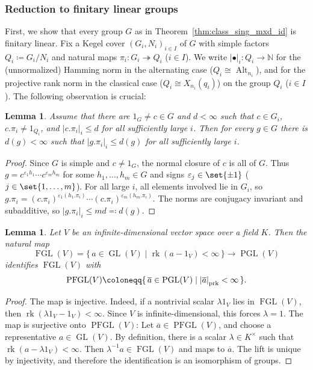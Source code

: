 \documentclass[a4paper,12pt]{amsproc}
\newcommand{\norm}[1]{\left\lvert#1\right\rvert}%
\DeclareMathOperator{\GL}{GL}%
\DeclareMathOperator{\rk}{rk}%
\DeclareMathOperator{\Alt}{Alt}%
\DeclareMathOperator{\FGL}{FGL}%
\DeclareMathOperator{\PFGL}{PFGL}%
\theoremstyle{plain}
\newtheorem{lemma}[definition]{Lemma}
\theoremstyle{definition}
\begin{document}
\subsubsection{Reduction to finitary linear groups}

First, we show that every group $G$ as in Theorem~\ref{thm:class_sing_mxd_id} is finitary linear. Fix a Kegel cover $(G_i,N_i)_{i\in I}$ of $G$ with simple factors $Q_i\coloneqq G_i/N_i$ and natural maps $\pi_i\colon G_i\twoheadrightarrow Q_i$ ($i\in I$). We write $\norm{\bullet}_i\colon Q_i\to\mathbb{N}$ for the (unnormalized) Hamming norm in the alternating case ($Q_i\cong \Alt_{n_i}$), and for the projective rank norm in the classical case ($Q_i\cong X_{n_i}(q_i)$) on the group $Q_i$ ($i\in I$). The following observation is crucial:

\begin{lemma}\label{lem:propagation}
Assume that there are $1_G\neq c\in G$ and $d<\infty$ such that
$c\in G_i$, $c.\pi_i\neq 1_{Q_i}$, and $\norm{c.\pi_i}_i\leq d$ for all
sufficiently large $i$. Then for every $g\in G$ there is
$d(g)<\infty$ such that $\norm{g.\pi_i}_i\leq d(g)$ for all sufficiently
large $i$.
\end{lemma}

\begin{proof}
Since $G$ is simple and $c\neq 1_G$, the normal closure of $c$ is all of
$G$. Thus $g=c^{\varepsilon_1h_1}\cdots c^{\varepsilon_m h_m}$ for some
$h_1,\ldots,h_m\in G$ and signs
$\varepsilon_j\in\set{\pm 1}$ ($j\in\set{1,\ldots,m}$). For all large $i$, all elements involved lie
in $G_i$, so $g.\pi_i=
(c.\pi_i)^{\varepsilon_1(h_1.\pi_i)}
\cdots
(c.\pi_i)^{\varepsilon_m(h_m.\pi_i)}$.
The norms are conjugacy invariant and subadditive, so
$\norm{g.\pi_i}_i\leq md\eqqcolon d(g)$.
\end{proof}


\begin{lemma}\label{lem:PFGL-FGL}
Let $V$ be an infinite-dimensional vector space over a field $K$. Then
the natural map
\[
  \FGL(V)=
  \{\,a\in \operatorname{GL}(V)\mid \rk(a-1_V)<\infty\,\}
  \longrightarrow \operatorname{PGL}(V)
\]
identifies $\FGL(V)$ with
\[
  \PFGL(V)\coloneqq
  \{\,\overline{a}\in \operatorname{PGL}(V)\mid\norm{\overline{a}}_{\rm prk}<\infty\,\}.
\]
\end{lemma}

\begin{proof}
The map is injective. Indeed, if a nontrivial scalar $\lambda 1_V$ lies
in $\FGL(V)$, then $\rk(\lambda 1_V-1_V)<\infty$. Since $V$ is
infinite-dimensional, this forces $\lambda=1$. The map is surjective onto $\PFGL(V)$: Let $\overline{a}\in \PFGL(V)$, and
choose a representative $a\in\GL(V)$. By definition, there
is a scalar $\lambda\in K^\times$ such that
$\rk(a-\lambda 1_V)<\infty$. Then $\lambda^{-1}a\in \FGL(V)$ and maps
to $\overline{a}$. The lift is unique by injectivity, and therefore the
identification is an isomorphism of groups.
\end{proof}
\end{document}
